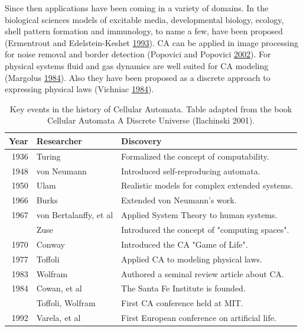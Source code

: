 \documentclass[
  openany]{book}
\begin{document}
Since then applications have been coming in a variety of domains. In the biological sciences models of excitable media, developmental biology, ecology, shell pattern formation and immunology, to name a few, have been proposed (Ermentrout and Edelstein-Keshet \protect\hyperlink{ref-ermentrout1993cellular}{1993}). CA can be applied in image processing for noise removal and border detection (Popovici and Popovici \protect\hyperlink{ref-popovici2002cellular}{2002}). For physical systems fluid and gas dynamics are well suited for CA modeling (Margolus \protect\hyperlink{ref-margolus1984physics}{1984}). Also they have been proposed as a discrete approach to expressing physical laws (Vichniac \protect\hyperlink{ref-vichniac1984simulating}{1984}).

\begin{table}

\caption{\label{tab:key-events}Key events in the history of Cellular Automata. Table adapted from the book Cellular Automata A Discrete Universe (Ilachinski 2001).}
\centering
\begin{tabular}[t]{rll}
\toprule
Year & Researcher & Discovery\\
\midrule
1936 & Turing & Formalized the concept of computability.\\
1948 & von Neumann & Introduced self-reproducing automata.\\
1950 & Ulam & Realistic models for complex extended systems.\\
1966 & Burks & Extended von Neumann's work.\\
1967 & von Bertalanffy, et al & Applied System Theory to human systems.\\
\addlinespace
1969 & Zuse & Introduced the concept of "computing spaces".\\
1970 & Conway & Introduced the CA "Game of Life".\\
1977 & Toffoli & Applied CA to modeling physical laws.\\
1983 & Wolfram & Authored a seminal review article about CA.\\
1984 & Cowan, et al & The Santa Fe Institute is founded.\\
\addlinespace
1987 & Toffoli, Wolfram & First CA conference held at MIT.\\
1992 & Varela, et al & First European conference on artificial life.\\
\bottomrule
\end{tabular}
\end{table}
\end{document}
